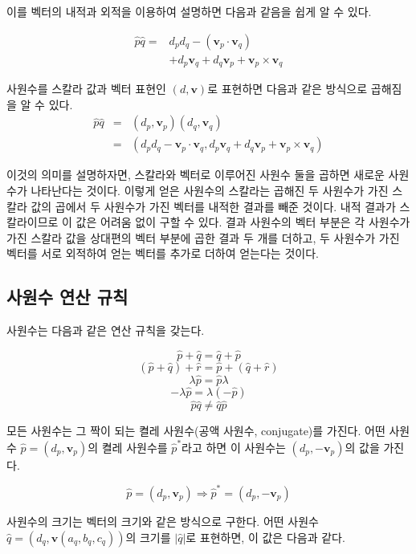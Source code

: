 이를 벡터의 내적과 외적을 이용하여 설명하면 다음과 같음을 쉽게 알 수 있다.

\begin{eqnarray}
\hat{p}\hat{q} = & d_p d_q  - (\mathbf v_p \cdot \mathbf v_q)  \\ \nonumber
&+ d_p \mathbf v_q + d_q \mathbf v_p + \mathbf v_p \times \mathbf v_q 
\end{eqnarray}

사원수를 스칼라 값과 벡터 표현인 $(d, \mathbf v)$로 표현하면 다음과 같은 방식으로 곱해짐을 알 수 있다.
\begin{eqnarray}
\hat{p}\hat{q} & = & (d_p, \mathbf v_p) (d_q , \mathbf v_q) \\ \nonumber
& =  & ( d_p d_q  - \mathbf v_p \cdot \mathbf v_q , d_p \mathbf v_q + d_q \mathbf v_p + \mathbf v_p \times \mathbf v_q ) 
\end{eqnarray}


이것의 의미를 설명하자면, 스칼라와 벡터로 이루어진 사원수 둘을 곱하면
새로운 사원수가 나타난다는 것이다. 이렇게 얻은 사원수의 스칼라는 곱해진 두 사원수가 가진 스칼라 값의 곱에서
두 사원수가 가진 벡터를 내적한 결과를 빼준 것이다. 내적 결과가 스칼라이므로 이 값은 어려움 없이 구할 수 있다.
결과 사원수의 벡터 부분은 각 사원수가 가진 스칼라 값을 상대편의 벡터 부분에 곱한 결과 두 개를 더하고,
두 사원수가 가진 벡터를 서로 외적하여 얻는 벡터를 추가로 더하여 얻는다는 것이다.


\subsection{사원수 연산 규칙}

사원수는 다음과 같은 연산 규칙을 갖는다.

$$\hat{p} + \hat{q} = \hat{q} + \hat{p}$$
$$(\hat{p} + \hat{q}) + \hat{r} = \hat{p} + (\hat{q} + \hat{r} )$$
$$\lambda \hat p = \hat p \lambda$$
$$- \lambda \hat p = \lambda ( - \hat p)$$
$$\hat p \hat q \neq \hat q \hat p$$

모든 사원수는 그 짝이 되는 켤레 사원수(공액 사원수, conjugate)를 가진다. 
어떤 사원수 $\hat p = (d_p, \mathbf v_p)$의 켤레 사원수를 $\hat p^*$라고 하면 이 사원수는 $(d_p, - \mathbf v_p)$의 값을 가진다.

$$\hat p = (d_p ,  \mathbf v_p) \Rightarrow \hat p^* = (d_p , -\mathbf v_p)$$

사원수의 크기는 벡터의 크기와 같은 방식으로 구한다.
어떤 사원수 $\hat q = (d_q, \mathbf v(a_q, b_q, c_q))$의 크기를 $|\hat q|$로 표현하면, 이 값은 다음과 같다.

